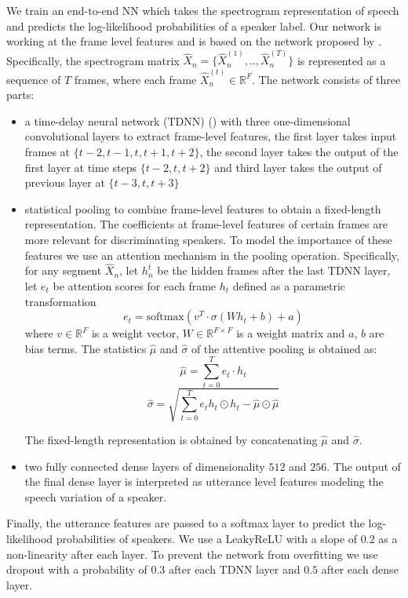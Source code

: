 We train an end-to-end NN which takes the spectrogram representation of speech and predicts the log-likelihood probabilities of a speaker label. Our network is working at the frame level features and is based on the network proposed by \cite{okabe2018attentive}. Specifically, the spectrogram matrix $\hat{X}_n=\{\hat{X}_n^{(1)},..,\hat{X}_n^{(T)}\}$ is represented as a sequence of $T$ frames, where each frame $\hat{X}_n^{(t)}\in \mathbb{R}^F$. The network consists of three parts: 
\begin{itemize}
    \item  a time-delay neural network (TDNN) (\cite{waibel1995phoneme}) 
with three one-dimensional convolutional layers to extract frame-level features, the first layer takes input frames at $\{t-2,t-1,t,t+1,t+2\}$, the second layer takes the output of the first layer at time steps $\{t-2,t,t+2\}$ and third layer takes the output of previous layer at $\{t-3,t,t+3\}$
    \item  statistical pooling to combine frame-level features to obtain a fixed-length representation. The coefficients at frame-level features of certain frames are more relevant for discriminating speakers. To model the importance of these features we use an attention mechanism in the pooling operation. Specifically, for any segment $\hat{X}_n$, let $h_n^t$ be the hidden frames after the last TDNN layer, let $e_t$ be attention scores for each frame $h_t$ defined as a parametric transformation 
\begin{equation}
    e_t = \text{softmax} (v^T \cdot \sigma (Wh_t + b) + a)
\end{equation}
where $v\in\mathbb{R}^F$ is a weight vector, $W\in \mathbb{R}^{F\times F}$ is a weight matrix and $a$, $b$ are bias terms. The statistics $\hat{\mu}$ and $\hat{\sigma}$ of the attentive pooling is obtained as:
\begin{equation}
    \hat{\mu} = \sum_{t=0}^T e_t\cdot h_t
\end{equation}
\begin{equation}
    \hat{\sigma} = \sqrt{\sum_{t=0}^T e_t h_t \odot h_t - \hat{\mu} \odot \hat{\mu}}
\end{equation}

The fixed-length representation is obtained by concatenating $\hat{\mu}$ and $\hat{\sigma}$.
\item two fully connected dense layers of dimensionality $512$ and $256$. The output of the final dense layer is interpreted as utterance level features modeling the speech variation of a speaker.
\end{itemize}
Finally, the utterance features are passed to a softmax layer to predict the log-likelihood probabilities of speakers.
We use a LeakyReLU with a slope of $0.2$ as a non-linearity after each layer. To prevent the network from overfitting we use dropout with a probability of $0.3$ after each TDNN layer and $0.5$ after each dense layer. 

